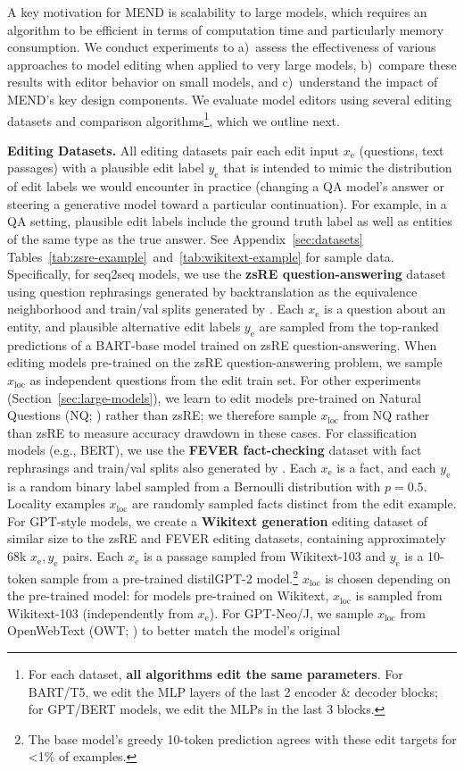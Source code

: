 \documentclass{article}
\newcommand{\name}{MEND}
\newcommand{\xe}{x_\text{e}}
\newcommand{\xloc}{x_\text{loc}}
\newcommand{\ye}{y_\text{e}}
\newcommand{\rebuttal}[1]{#1}
\begin{document}
A key motivation for {\name} is scalability to large models, which requires an algorithm to be efficient in terms of computation time and particularly memory consumption. We conduct experiments to a)~assess the effectiveness of various approaches to model editing when applied to very large models, b)~compare these results with editor behavior on small models, and c)~understand the impact of \name's key design components. We evaluate model editors using several editing datasets and comparison algorithms\footnote{\rebuttal{For each dataset, \textbf{all algorithms edit the same parameters}. For BART/T5, we edit the MLP layers of the last 2 encoder \& decoder blocks; for GPT/BERT models, we edit the MLPs in the last 3 blocks.}}, which we outline next.

\textbf{Editing Datasets.} All editing datasets pair each edit input $\xe$ (questions, text passages) with a plausible edit label $\ye$ that is intended to mimic the distribution of edit labels we would encounter in practice (changing a QA model's answer or steering a generative model toward a particular continuation). For example, in a QA setting, plausible edit labels include the ground truth label as well as entities of the same type as the true answer. See Appendix~\ref{sec:datasets} Tables~\ref{tab:zsre-example}~and~\ref{tab:wikitext-example} for sample data. Specifically, for seq2seq models, we use the \textbf{zsRE question-answering} dataset \citep{levy2017zero} using question rephrasings generated by backtranslation as the equivalence neighborhood and train/val splits generated by \citet{Cao2021EditingFK}. Each $\xe$ is a question about an entity, and plausible alternative edit labels $\ye$ are sampled from the top-ranked predictions of a BART-base model trained on zsRE question-answering. When editing models pre-trained on the zsRE question-answering problem, we sample $\xloc$ as independent questions from the edit train set. For other experiments (Section~\ref{sec:large-models}), we learn to edit models pre-trained on Natural Questions (NQ; \citet{kwiatkowski2019natural}) rather than zsRE; we therefore sample $\xloc$ from NQ rather than zsRE to measure accuracy drawdown in these cases. For classification models (e.g., BERT), we use the \textbf{FEVER fact-checking} dataset \citep{Thorne18Fever} with fact rephrasings and train/val splits also generated by \citet{Cao2021EditingFK}. Each $\xe$ is a fact, and each $\ye$ is a random binary label sampled from a Bernoulli distribution with $p=0.5$. Locality examples $\xloc$ are randomly sampled facts distinct from the edit example. For GPT-style models, we create a \textbf{Wikitext generation} editing dataset of similar size to the zsRE and FEVER editing datasets, containing approximately 68k $\xe,\ye$ pairs. Each $\xe$ is a passage sampled from Wikitext-103 and $\ye$ is a 10-token sample from a pre-trained distilGPT-2 model.\footnote{The base model's greedy 10-token prediction agrees with these edit targets for \textless 1\% of examples.} $\xloc$ is chosen depending on the pre-trained model: for models pre-trained on Wikitext, $\xloc$ is sampled from Wikitext-103 (independently from $\xe$). For GPT-Neo/J, we sample $\xloc$ from OpenWebText (OWT; \citep{Gokaslan2019OpenWeb}) to better match the model's original 
\end{document}
